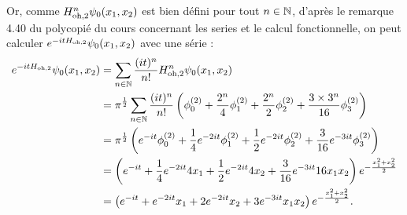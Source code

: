 %
Or, comme $H_\text{oh,2}^n \psi_0(x_1,x_2)$ est bien défini pour
tout ${n \in \mathbb{N}}$, d'après le remarque 4.40 du polycopié du cours
concernant les series et le calcul fonctionnelle, on peut calculer
$e^{-it H_\text{oh,2}} \psi_0(x_1,x_2)$ avec une série :
\begin{align}
    e^{-it \hodd{2}} \psi_0(x_1,x_2)
    &= \sum_{\inn{n}} \frac{(it)^n}{n!} \hodd{2}^n \psi_0(x_1,x_2) \\
%
    &= \pi^\ud \sum_{\inn{n}} \frac{(it)^n}{n!}
    \left( \phi_0^{(2)}
    + \frac{2^n}{4} \phi_1^{(2)}
    + \frac{2^n}{2} \phi_2^{(2)}
    + \frac{3 \times 3^n}{16} \phi_3^{(2)} \right) \\
%
    &= \pi^\ud \left(
    e^{-it} \phi_0^{(2)}
    + \udd{4} e^{-2it} \phi_1^{(2)}
    + \udd{2} e^{-2it} \phi_2^{(2)}
    + \frac{3}{16} e^{-3it} \phi_3^{(2)} \right) \\
%
    &= \left(
    e^{-it}
    + \udd{4} e^{-2it} 4 x_1
    + \udd{2} e^{-2it} 4 x_2
    + \frac{3}{16} e^{-3it} 16 x_1 x_2
    \right) e^{-\frac{x_1^2 + x_2^2}{2}} \\
%
    &= \left(
    e^{-it}
    + e^{-2it} x_1
    + 2 e^{-2it} x_2
    + 3 e^{-3it} x_1 x_2
    \right) e^{-\frac{x_1^2 + x_2^2}{2}}.
\end{align}



















